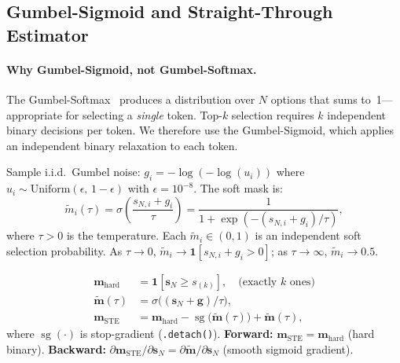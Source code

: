 \documentclass[11pt,a4paper]{article}
\newcommand{\vm}{\mathbf{m}}        %
\newcommand{\vs}{\mathbf{s}}
\begin{document}
\subsection{Gumbel-Sigmoid and Straight-Through Estimator}
\label{subsec:gumbel}

\paragraph{Why Gumbel-Sigmoid, not Gumbel-Softmax.}
The Gumbel-Softmax~\citep{jang2017categorical} produces a distribution over $N$
options that sums to~1---appropriate for selecting a \emph{single} token.
Top-$k$ selection requires $k$ independent binary decisions per token.
We therefore use the Gumbel-Sigmoid, which applies an independent binary
relaxation to each token.

\begin{mathbox}[title={Gumbel-Sigmoid Relaxation}]
Sample i.i.d.\ Gumbel noise: $g_i = -\log(-\log(u_i))$ where
$u_i \sim \mathrm{Uniform}(\epsilon,\,1{-}\epsilon)$ with
$\epsilon{=}10^{-8}$. The soft mask is:
\begin{equation}
  \tilde{m}_i(\tau)
  = \sigma\!\left(\frac{s_{N,i}+g_i}{\tau}\right)
  = \frac{1}{1+\exp(-(s_{N,i}+g_i)/\tau)},
  \label{eq:gumbel_sigmoid}
\end{equation}
where $\tau>0$ is the temperature. Each $\tilde{m}_i\in(0,1)$ is an
independent soft selection probability. As $\tau\to0$,
$\tilde{m}_i\to\mathbf{1}[s_{N,i}+g_i>0]$; as $\tau\to\infty$,
$\tilde{m}_i\to0.5$.
\end{mathbox}

\begin{mathbox}[title={Straight-Through Estimator (STE)}]
\begin{align}
  \vm_{\mathrm{hard}} &= \mathbf{1}[\vs_N \geq s_{(k)}],
    \quad \text{(exactly $k$ ones)} \label{eq:hard_mask} \\[2pt]
  \tilde{\vm}(\tau) &= \sigma\!\bigl((\vs_N+\mathbf{g})/\tau\bigr),
    \label{eq:soft_mask} \\[2pt]
  \vm_{\mathrm{STE}} &= \vm_{\mathrm{hard}}
    - \operatorname{sg}\!\bigl(\tilde{\vm}(\tau)\bigr)
    + \tilde{\vm}(\tau),
  \label{eq:ste}
\end{align}
where $\operatorname{sg}(\cdot)$ is stop-gradient (\texttt{.detach()}).
\textbf{Forward:} $\vm_{\mathrm{STE}}=\vm_{\mathrm{hard}}$ (hard binary).
\textbf{Backward:} $\partial\vm_{\mathrm{STE}}/\partial\vs_N =
\partial\tilde{\vm}/\partial\vs_N$ (smooth sigmoid gradient).
\end{mathbox}
\end{document}
